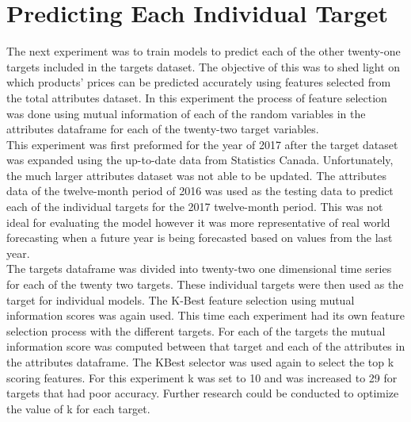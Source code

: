 \documentclass[12pt]{dalthesis}
\begin{document}
\section{Predicting Each Individual Target}
The next experiment was to train models to predict each of the other twenty-one targets included in the targets dataset. The objective of this was to shed light on which products’ prices can be predicted accurately using features selected from the total attributes dataset. In this experiment the process of feature selection was done using mutual information of each of the random variables in the attributes dataframe for each of the twenty-two target variables. \\

This experiment was first preformed for the year of 2017 after the target dataset was expanded using the up-to-date data from Statistics Canada. Unfortunately, the much larger attributes dataset was not able to be updated. The attributes data of the twelve-month period of 2016 was used as the testing data to predict each of the individual targets for the 2017 twelve-month period. This was not ideal for evaluating the model however it was more representative of real world forecasting when a future year is being forecasted based on values from the last year. \\

The targets dataframe was divided into twenty-two one dimensional time series for each of the twenty two targets. These individual targets were then used as the target for individual models. The K-Best feature selection using mutual information scores was again used. This time each experiment had its own feature selection process with the different targets. For each of the targets the mutual information score was computed between that target and each of the attributes in the attributes dataframe. The KBest selector was used again to select the top k scoring features. For this experiment k was set to 10 and was increased to 29 for targets that had poor accuracy. Further research could be conducted to optimize the value of k for each target. \\
\end{document}
